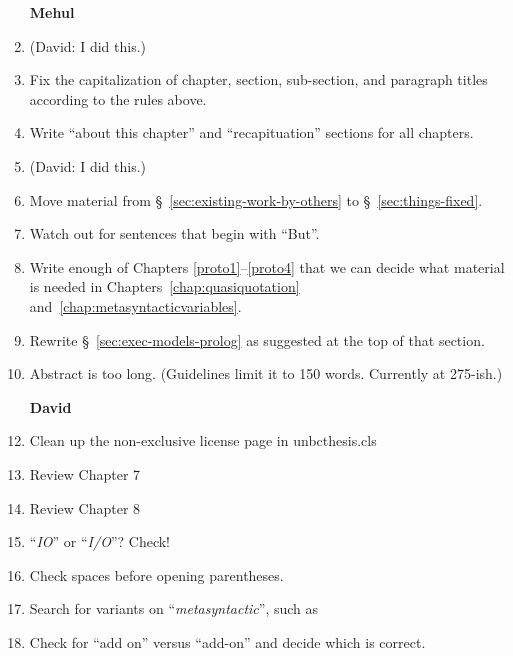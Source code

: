 \begin{scope}
\begin{enumerate}
\item [\textbf{Mehul}]

\item (David: I did this.)

\item
  Fix the capitalization of chapter,
  section, sub-section, and paragraph titles according to the rules above.

\item
  Write ``about this chapter'' and ``recapituation'' sections for all chapters.

\item
  (David: I did this.)

\item
    Move material from \S~\ref{sec:existing-work-by-others} to \S~\ref{sec:things-fixed}. 

\item
  Watch out for sentences that begin with ``But''.

\item
  Write enough of Chapters \ref{proto1}--\ref{proto4} that we can decide
  what material is needed in Chapters~\ref{chap:quasiquotation}
  and~\ref{chap:metasyntacticvariables}.

\item
  Rewrite \S~\ref{sec:exec-models-prolog} as suggested at the top of that section. 

\item
  Abstract is too long.  (Guidelines limit it to 150 words.  Currently
  at 275-ish.)



\item [\textbf{David}]
\item Clean up the non-exclusive license page in unbcthesis.cls
\item Review Chapter 7
\item Review Chapter 8
\item ``\textit{IO}'' or ``\textit{I/O}''?  Check!
\item Check spaces before opening parentheses.
\item Search for variants on ``\textit{metasyntactic}'', such as
\item Check for ``add on'' versus ``add-on'' and decide which is correct.
\end{enumerate}


\end{scope}
